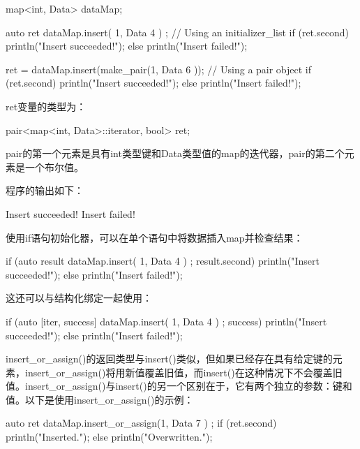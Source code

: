 \begin{cpp}
map<int, Data> dataMap;

auto ret { dataMap.insert({ 1, Data { 4 } }) }; // Using an initializer_list
if (ret.second) { println("Insert succeeded!"); }
else { println("Insert failed!"); }

ret = dataMap.insert(make_pair(1, Data { 6 })); // Using a pair object
if (ret.second) { println("Insert succeeded!"); }
else { println("Insert failed!"); }
\end{cpp}

ret变量的类型为：

\begin{cpp}
pair<map<int, Data>::iterator, bool> ret;
\end{cpp}

pair的第一个元素是具有int类型键和Data类型值的map的迭代器，pair的第二个元素是一个布尔值。

程序的输出如下：

\begin{shell}
Insert succeeded!
Insert failed!
\end{shell}

使用if语句初始化器，可以在单个语句中将数据插入map并检查结果：

\begin{cpp}
if (auto result { dataMap.insert({ 1, Data { 4 } }) }; result.second) {
    println("Insert succeeded!");
} else {
    println("Insert failed!");
}
\end{cpp}

这还可以与结构化绑定一起使用：

\begin{cpp}
if (auto [iter, success] { dataMap.insert({ 1, Data { 4 } }) }; success) {
    println("Insert succeeded!");
} else {
    println("Insert failed!");
}
\end{cpp}


insert\_or\_assign()的返回类型与insert()类似，但如果已经存在具有给定键的元素，insert\_or\_assign()将用新值覆盖旧值，而insert()在这种情况下不会覆盖旧值。insert\_or\_assign()与insert()的另一个区别在于，它有两个独立的参数：键和值。以下是使用insert\_or\_assign()的示例：

\begin{cpp}
auto ret { dataMap.insert_or_assign(1, Data { 7 }) };
if (ret.second) { println("Inserted."); }
else { println("Overwritten."); }
\end{cpp}

